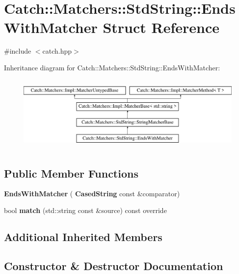 \section{Catch\+::Matchers\+::Std\+String\+::Ends\+With\+Matcher Struct Reference}
\label{struct_catch_1_1_matchers_1_1_std_string_1_1_ends_with_matcher}


{\ttfamily \#include $<$catch.\+hpp$>$}

Inheritance diagram for Catch\+::Matchers\+::Std\+String\+::Ends\+With\+Matcher\+:\begin{figure}[H]
\begin{center}
\leavevmode
\includegraphics[height=3.758389cm]{struct_catch_1_1_matchers_1_1_std_string_1_1_ends_with_matcher}
\end{center}
\end{figure}
\subsection*{Public Member Functions}
\begin{DoxyCompactItemize}
\item 
\textbf{ Ends\+With\+Matcher} (\textbf{ Cased\+String} const \&comparator)
\item 
bool \textbf{ match} (std\+::string const \&source) const override
\end{DoxyCompactItemize}
\subsection*{Additional Inherited Members}


\subsection{Constructor \& Destructor Documentation}
\mbox{\label{struct_catch_1_1_matchers_1_1_std_string_1_1_ends_with_matcher_aa5ec700b4629562f74f362080accfd7b}} 
